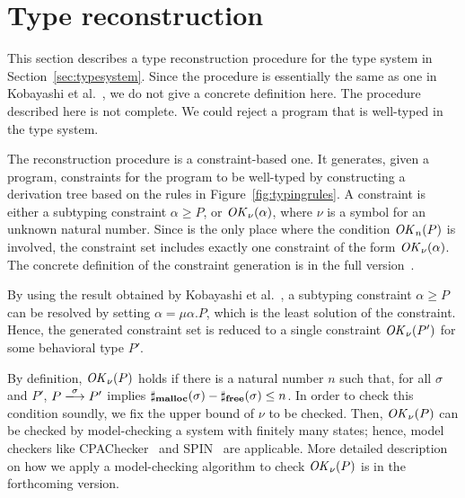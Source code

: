 \section{Type reconstruction}
\label{sec:reconstruction}


This section describes a type reconstruction procedure for the type
system in Section~\ref{sec:typesystem}.  Since the procedure is
essentially the same as one in Kobayashi et
al.~\cite{DBLP:journals/lmcs/KobayashiSW06}, we do not give a concrete
definition here.  The procedure described here is not complete.  We
could reject a program that is well-typed in the type system.

The reconstruction procedure is a constraint-based one.  It generates,
given a program, constraints for the program to be well-typed by
constructing a derivation tree based on the rules in
Figure~\ref{fig:typingrules}.  A constraint is either a subtyping
constraint \(\alpha \ge P\), or \(\mathit{OK}_\nu(\alpha)\), where \(\nu\) is
a symbol for an unknown natural number.  Since  is the only
place where the condition \(\mathit{OK}_n(P)\) is involved, the constraint set
includes exactly one constraint of the form \(\mathit{OK}_\nu(\alpha)\).  The
concrete definition of the constraint generation is in the full
version~\cite{fullversion}.

By using the result obtained by Kobayashi et al.~\cite[Lemma
  3.8]{DBLP:journals/lmcs/KobayashiSW06}, a subtyping constraint
\(\alpha \ge P\) can be resolved by setting \(\alpha = \mu
\alpha. P\), which is the least solution of the constraint.  Hence,
the generated constraint set is reduced to a single constraint
\(\mathit{OK}_{\nu}(P')\) for some behavioral type \(P'\).

By definition, \(\mathit{OK}_{\nu}(P)\) holds if there is a natural number
\(n\) such that, for all \(\sigma\) and \(P'\), \(P
\xlongrightarrow{\sigma} P'\) implies \(\sharp_{\mathbf{malloc}}(\sigma) -
\sharp_{\mathbf{free}}(\sigma) \le n\).  In order to check this condition
soundly, we fix the upper bound of \(\nu\) to be checked.  Then,
\(\mathit{OK}_{\nu}(P)\) can be checked by model-checking a system with
finitely many states; hence, model checkers like CPAChecker~\cite{}
and SPIN~\cite{} are applicable.  More detailed description on how we
apply a model-checking algorithm to check \(\mathit{OK}_\nu(P)\) is in the
forthcoming version.

